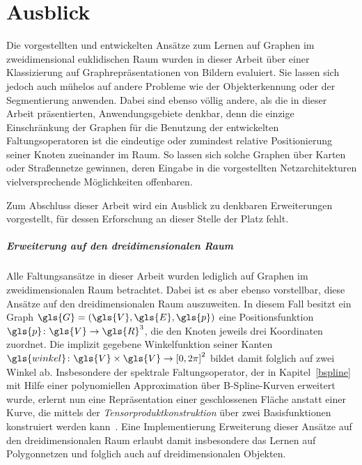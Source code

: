 \chapter{Ausblick}
\label{ausblick}

Die vorgestellten und entwickelten Ansätze zum Lernen auf Graphen im zweidimensional euklidischen Raum wurden in dieser Arbeit über einer Klassizierung auf Graphrepräsentationen von Bildern evaluiert.
Sie lassen sich jedoch auch mühelos auf andere Probleme wie \zB{} der Objekterkennung oder der Segmentierung anwenden.
Dabei sind ebenso völlig andere, als die in dieser Arbeit präsentierten, Anwendungsgebiete denkbar, denn die einzige Einschränkung der Graphen für die Benutzung der entwickelten Faltungsoperatoren ist die eindeutige oder zumindest relative Positionierung seiner Knoten zueinander im Raum.
So lassen sich solche Graphen \bspw{} über Karten oder Straßennetze gewinnen, deren Eingabe in die vorgestellten Netzarchitekturen vielversprechende Möglichkeiten offenbaren.

Zum Abschluss dieser Arbeit wird ein Ausblick zu denkbaren Erweiterungen vorgestellt, für dessen Erforschung an dieser Stelle der Platz fehlt.

\paragraph{Erweiterung auf den dreidimensionalen Raum}
\label{dredimensionale_erweiterung}

Alle Faltungsansätze in dieser Arbeit wurden lediglich auf Graphen im zweidimensionalen Raum betrachtet.
Dabei ist es aber ebenso vorstellbar, diese Ansätze auf den dreidimensionalen Raum auszuweiten.
In diesem Fall besitzt ein Graph $\gls{G} = \left(\gls{V}, \gls{E}, \gls{p}\right)$ eine Positionsfunktion $\gls{p} \colon \gls{V} \to \gls{R}^3$, die den Knoten jeweils drei Koordinaten zuordnet.
Die implizit gegebene Winkelfunktion seiner Kanten $\gls{winkel} \colon \gls{V} \times \gls{V} \to {\left[0, 2\pi\right]}^2$ bildet damit folglich auf zwei Winkel ab.
Insbesondere der spektrale Faltungsoperator, der in Kapitel~\ref{bspline} mit Hilfe einer polynomiellen Approximation über B-Spline-Kurven erweitert wurde, erlernt nun eine Repräsentation einer geschlossenen Fläche anstatt einer Kurve, die mittels der \emph{Tensorproduktkonstruktion} über zwei Basisfunktionen konstruiert werden kann~\cite{gm}.
Eine Implementierung \bzw{} Erweiterung dieser Ansätze auf den dreidimensionalen Raum erlaubt damit insbesondere das Lernen auf Polygonnetzen und folglich auch auf dreidimensionalen Objekten.

